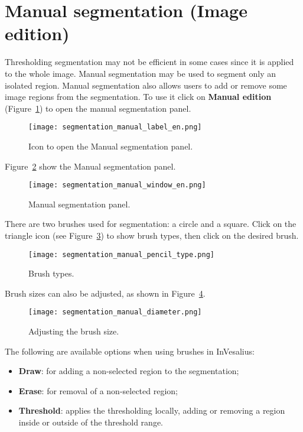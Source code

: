 \section{Manual segmentation (Image edition)}

Thresholding segmentation may not be efficient in some cases since it is applied to the whole image. Manual segmentation may be used to segment only an isolated region. Manual segmentation also allows users to add or remove some image regions from the segmentation. To use it click on \textbf{Manual edition} (Figure~\ref{fig:advanced_edition}) to open the manual segmentation panel.

\begin{figure}[!htb]
\centering
\texttt{[image: segmentation\_manual\_label\_en.png]}
\caption{Icon to open the Manual segmentation panel.}
\label{fig:advanced_edition}
\end{figure}

Figure~\ref{fig:edition_slices_ref} show the Manual segmentation panel.

\begin{figure}[!htb]
\centering
\texttt{[image: segmentation\_manual\_window\_en.png]}
\caption{Manual segmentation panel.}
\label{fig:edition_slices_ref}
\end{figure}

There are two brushes used for segmentation: a circle and a square. Click on the triangle icon (see Figure~\ref{fig:brush_type}) to show brush types, then click on the desired brush.

\begin{figure}[!htb]
\centering
\texttt{[image: segmentation\_manual\_pencil\_type.png]}
\caption{Brush types.}
\label{fig:brush_type}
\end{figure}

\newpage

Brush sizes can also be adjusted, as shown in Figure~\ref{fig:select_diameter}.

\begin{figure}[!htb]
\centering
\texttt{[image: segmentation\_manual\_diameter.png]}
\caption{Adjusting the brush size.}
\label{fig:select_diameter}
\end{figure}

The following are available options when using brushes in InVesalius:

\begin{itemize}
	\item \textbf{Draw}: for adding a non-selected region to the segmentation;

	\item \textbf{Erase}: for removal of a non-selected region;

	\item \textbf{Threshold}: applies the thresholding locally, adding or removing a region inside or outside of the threshold range.
\end{itemize}

